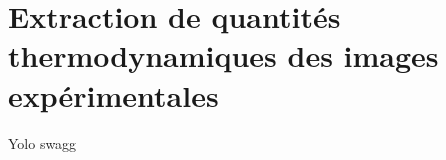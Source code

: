 \chapter{Extraction de quantités thermodynamiques des images expérimentales}
\label{ch:anex_mesure_temp}


Yolo swagg